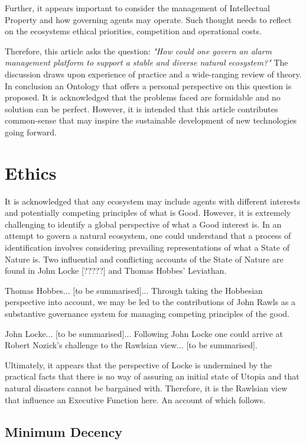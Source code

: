 \documentclass[11pt, oneside]{article}   	%
\begin{document}
Further, it appears important to consider the management of Intellectual Property and how governing agents may operate.
Such thought needs to reflect on the ecosystems ethical priorities, competition and operational costs.\

Therefore, this article asks the question: \emph{"How could one govern an alarm management platform to support a stable and diverse natural ecosystem?"}
The discussion draws upon experience of practice and a wide-ranging review of theory.
In conclusion an Ontology that offers a personal perspective on this question is proposed.
It is acknowledged that the problems faced are formidable and no solution can be perfect.
However, it is intended that this article contributes common-sense that may inspire the sustainable development of new technologies going forward.\


\section{Ethics}
It is acknowledged that any ecosystem may include agents with different interests and potentially competing principles of what is Good.
However, it is extremely challenging to identify a global perspective of what a Good interest is.
In an attempt to govern a natural ecosystem, one could understand that a process of identification involves considering prevailing representations of what a State of Nature is.
Two influential and conflicting accounts of the State of Nature are found in John Locke [?????] and Thomas Hobbes' Leviathan.\

Thomas Hobbes... [to be summarised]...
Through taking the Hobbesian perspective into account, we may be led to the contributions of John Rawls as a substantive governance system for managing competing principles of the good.\

John Locke... [to be summarised]...
Following John Locke one could arrive at Robert Nozick's challenge to the Rawlsian view... [to be summarised].\

Ultimately, it appears that the perspective of Locke is undermined by the practical facts that there is no way of assuring an initial state of Utopia and that natural disasters cannot be bargained with.
Therefore, it is the Rawlsian view that influence an Executive Function here. An account of which follows.\

\subsection{Minimum Decency}
\end{document}
